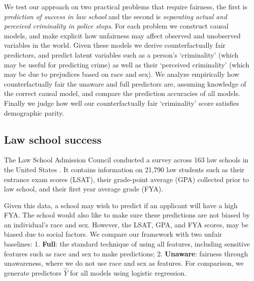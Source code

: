 We test our approach on two practical problems that require fairness, the first is \emph{prediction of success in law school} and the second is \emph{separating actual and perceived criminality in police stops}. For each problem we construct causal models, and make explicit how unfairness may affect observed and unobserved variables in the world. Given these models we derive counterfactually fair predictors, and predict latent variables such as a person's `criminality' (which may be useful for predicting crime) as well as their `perceived criminality' (which may be due to prejudices based on race and sex). We analyze empirically how counterfactually fair the unaware and full predictors are, assuming knowledge of the correct causal model, and compare the prediction accuracies of all models. Finally we judge how well our counterfactually fair `criminality' score satisfies demographic parity.



\subsection{Law school success}
\label{sec:law-school-success}
The Law School Admission Council
conducted a survey across 163 law
schools in the United States \cite{wightman1998lsac}. %
It contains information on 21,790 law students such as their entrance exam scores (LSAT), their grade-point
average (GPA) collected prior to law school, and their first year average grade
(FYA). %

Given this data, a school may wish to predict if an applicant will
have a high FYA. %
The school would also like to make sure these
predictions are not biased by an individual's race and sex. However,
the LSAT, GPA, and FYA scores, may be biased due to social factors. %
We compare our framework with
two unfair baselines: 1. \textbf{Full}: the standard technique of
using all features, including sensitive features such as race and sex
to make predictions; 2. \textbf{Unaware}: fairness through
unawareness, where we do not use race and sex as features. For comparison, we generate predictors $\hat Y$ for all models using logistic regression.


